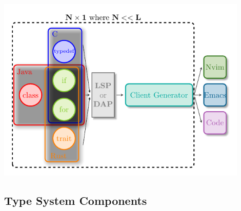 \documentclass[9pt,xcolor=table,svgnames]{beamer}
\begin{document}
\begin{frame}{\secname}
    \framesubtitle{\subsecname}

    \begin{center}
        \includegraphics[width=0.9\textwidth]{figs/lsp-combination-nx1.pdf}
    \end{center}
\end{frame}


\subsection[Type System Components]{Type System Components}
\end{document}
